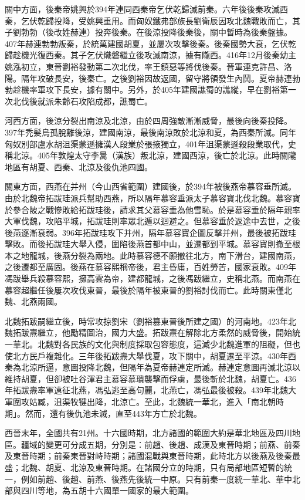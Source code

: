 關中方面，後秦帝姚興於394年連同西秦帝乞伏乾歸滅前秦。六年後後秦攻滅西秦，乞伏乾歸投降，受姚興重用。而匈奴鐵弗部族長劉衛辰因攻北魏戰敗而亡，其子劉勃勃（後改姓赫連）投奔後秦。在後涼投降後秦後，關中暫時為後秦盤據。407年赫連勃勃叛秦，於統萬建國胡夏，並屢次攻擊後秦。後秦國勢大衰，乞伏乾歸趁機光復西秦。其子乞伏熾磐繼立後攻滅南涼，據有隴西。416年12月後秦幼主姚泓初立，東晉劉裕發動第二次北伐，率王鎮惡等將伐後秦。晉軍連克許昌、洛陽。隔年攻破長安，後秦亡。之後劉裕因故返國，留守將領發生內鬨。夏帝赫連勃勃趁機率軍攻下長安，據有關中。另外，於405年建國譙蜀的譙縱，早在劉裕第一次北伐後就派朱齡石攻陷成都，譙蜀亡。

河西方面，後涼分裂出南涼及北涼，由於四周強敵漸漸威脅，最後向後秦投降。397年禿髮烏孤脫離後涼，建國南涼，最後南涼敗於北涼和夏，為西秦所滅。同年匈奴別部盧水胡沮渠蒙遜擁漢人段業於張掖獨立，401年沮渠蒙遜殺段業取代，史稱北涼。405年敦煌太守李暠（漢族）叛北涼，建國西涼，後亡於北涼。此時關隴地區有胡夏、西秦、北涼及後仇池四國。

關東方面，西燕在并州（今山西省範圍）建國後，於394年被後燕帝慕容垂所滅。由於北魏帝拓跋珪派兵幫助西燕，所以隔年慕容垂派太子慕容寶北伐北魏。慕容寶於參合陂之戰慘敗給拓跋珪後，請求其父慕容垂為他雪恥。於是慕容垂於隔年親率大軍伐魏，攻陷平城，拓跋珪則率眾北遁以迴避之。但慕容垂於返途中去世，之後後燕逐漸衰弱。396年拓跋珪攻下并州，隔年慕容寶企圖反擊并州，最後被拓跋珪擊敗。而後拓跋珪大舉入侵，圍陷後燕首都中山，並遷都到平城。慕容寶則撤至根本之地龍城，後燕分裂為兩地。此時慕容德不願撤往北方，南下滑台，建國南燕，之後遷都至廣固。後燕在慕容熙稱帝後，君主昏庸，百姓勞苦，國家衰敗。409年馮跋舉兵殺慕容熙，擁高雲為帝，建都龍城，之後馮跋繼立，史稱北燕。而南燕在慕容超繼任後屢次攻伐東晉，最後於隔年被東晉的劉裕討伐而亡。此時關東僅北魏、北燕兩國。

北魏拓跋嗣繼立後，時常攻掠劉宋（劉裕篡東晉後所建之國）的河南地。423年北魏拓跋燾繼立，他勵精圖治，國力大盛。拓跋燾在解除北方柔然的威脅後，開始統一華北。北魏對各民族的文化與制度採取包容態度，這減少北魏進軍的阻礙，但也使北方民戶複雜化。三年後拓跋燾大舉伐夏，攻下關中，胡夏遷至平涼。430年西秦為北涼所逼，意圖投降北魏，但隔年為夏帝赫連定所滅。赫連定意圖再滅北涼以維持胡夏，但卻被吐谷渾君主慕容慕璝襲擊而俘虜，最後斬於北魏，胡夏亡。436年拓跋燾率軍遠征北燕，馮弘逃至高句麗，北燕亡，馮弘最後被殺。439年北魏大軍圍攻姑臧，沮渠牧犍出降，北涼亡。至此，北魏統一華北，進入「南北朝時期」。然而，還有後仇池未滅，直至443年方亡於北魏。

西晉末年，全國共有21州。十六國時期，北方諸國的範圍大約是華北地區及四川地區。疆域的變更可分成五期，分別是：前趙、後趙、成漢及東晉時期；前燕、前秦及東晉時期；前秦東晉對峙時期；諸國混戰與東晉時期，此時北方以後燕及後秦最盛；北魏、胡夏、北涼及東晉時期。在諸國分立的時期，只有局部地區短暫的統一，例如前趙、後趙、前燕、後燕先後統一中原。只有前秦一度統一華北、華中北部與四川等地，為五胡十六國單一國家的最大範圍。

